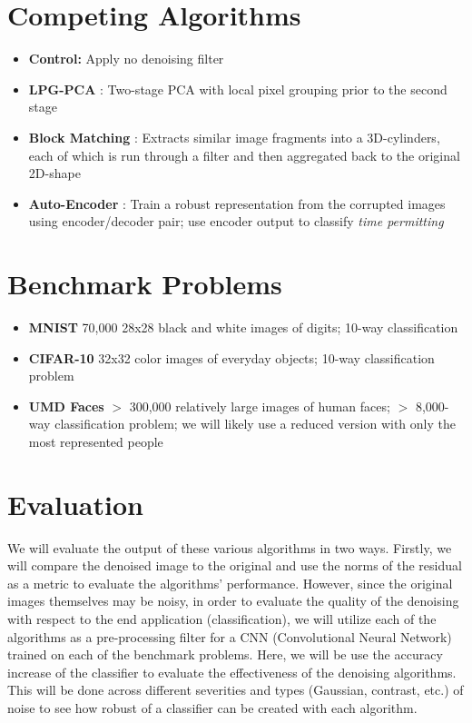 \documentclass[11pt]{article} %
\begin{document}
\section*{Competing Algorithms}
\begin{itemize}
  \item \textbf{Control:} Apply no denoising filter
  \item \textbf{LPG-PCA} \cite{zhang2010two}:   Two-stage PCA with local pixel grouping prior to the second stage
  \item \textbf{Block Matching} \cite{dabov2006image}: Extracts similar image fragments into a 3D-cylinders, each of which is run through a filter and then aggregated back to the original 2D-shape
\item \textbf{Auto-Encoder} \cite{vincent2010stacked}:  Train a robust representation from the corrupted images using encoder/decoder pair; use encoder output to classify \textit{time permitting}
\end{itemize}

\section*{Benchmark Problems}
\begin{itemize}
\item \textbf{MNIST} 70,000 28x28 black and white images of digits; 10-way classification
\item \textbf{CIFAR-10} 32x32 color images of everyday objects; 10-way classification problem
\item \textbf{UMD Faces} $>$ 300,000 relatively large images of human faces; $>$ 8,000-way classification problem; we will likely use a reduced version with only the most represented people
\end{itemize}

\section*{Evaluation}

 We will evaluate the output of these various algorithms in two ways. Firstly, we will compare the denoised image to the original and use the norms of the residual as a metric to evaluate the algorithms' performance. 
However, since the original images themselves may be noisy, in order to evaluate the quality of the denoising with respect to the end application (classification), we will utilize each of the algorithms as a pre-processing filter for a CNN (Convolutional Neural Network) trained on each of the benchmark problems. 
Here, we will be use the accuracy increase of the classifier to evaluate the effectiveness of the denoising algorithms. This will be done across different severities and types (Gaussian, contrast, etc.) of noise to see how robust of a classifier can be created with each algorithm.


\nocite{*}


{}
\end{document}
